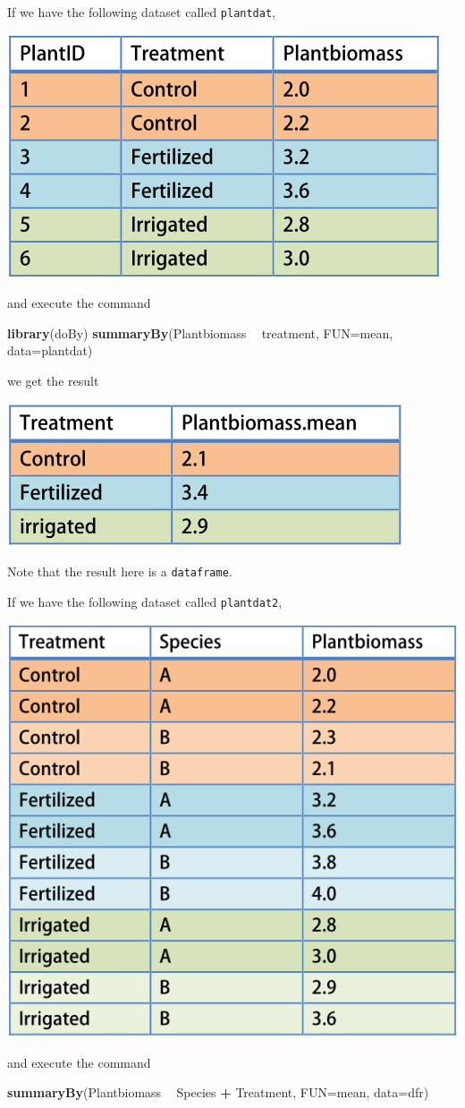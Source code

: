 \documentclass[]{book}
\newenvironment{Shaded}{\begin{snugshade}}{\end{snugshade}}
\newcommand{\DataTypeTok}[1]{\textcolor[rgb]{0.13,0.29,0.53}{#1}}
\newcommand{\KeywordTok}[1]{\textcolor[rgb]{0.13,0.29,0.53}{\textbf{#1}}}
\newcommand{\NormalTok}[1]{#1}
\newcommand{\OperatorTok}[1]{\textcolor[rgb]{0.81,0.36,0.00}{\textbf{#1}}}
\newcommand{\StringTok}[1]{\textcolor[rgb]{0.31,0.60,0.02}{#1}}
\begin{document}
If we have the following dataset called \texttt{plantdat},

\includegraphics[width=0.33\linewidth]{screenshots/exampledata}

and execute the command

\begin{Shaded}
\begin{Highlighting}[]
\KeywordTok{library}\NormalTok{(doBy)}
\KeywordTok{summaryBy}\NormalTok{(Plantbiomass }\OperatorTok{~}\StringTok{ }\NormalTok{treatment, }\DataTypeTok{FUN=}\NormalTok{mean, }\DataTypeTok{data=}\NormalTok{plantdat)}
\end{Highlighting}
\end{Shaded}

we get the result

\includegraphics[width=0.33\linewidth]{screenshots/summarybyresult}

Note that the result here is a \texttt{dataframe}.

If we have the following dataset called \texttt{plantdat2},

\includegraphics[width=0.33\linewidth]{screenshots/exampledatalarger}

and execute the command

\begin{Shaded}
\begin{Highlighting}[]
\KeywordTok{summaryBy}\NormalTok{(Plantbiomass }\OperatorTok{~}\StringTok{ }\NormalTok{Species }\OperatorTok{+}\StringTok{ }\NormalTok{Treatment, }\DataTypeTok{FUN=}\NormalTok{mean, }\DataTypeTok{data=}\NormalTok{dfr)}
\end{Highlighting}
\end{Shaded}
\end{document}
